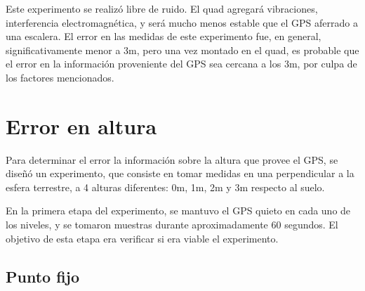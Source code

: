 \documentclass[spanish,12pt,a4paper,titlepage]{report}
\begin{document}
Este experimento se realizó libre de ruido. El quad agregará vibraciones, interferencia electromagnética, y será mucho menos estable que el GPS aferrado a una escalera. El error en las medidas de este experimento fue, en general, significativamente menor a 3m, pero una vez montado en el quad, es probable que el error en la información proveniente del GPS sea cercana a los 3m, por culpa de los factores mencionados.

%
%

\section{Error en altura}
\label{sec:error-en-altura}

Para determinar el error la información sobre la altura que provee el GPS, se diseñó un experimento, que consiste en tomar medidas en una perpendicular a la esfera terrestre, a 4 alturas diferentes: 0m, 1m, 2m y 3m respecto al suelo.

En la primera etapa del experimento, se mantuvo el GPS quieto en cada uno de los niveles, y se tomaron muestras durante aproximadamente 60 segundos. El objetivo de esta etapa era verificar si era viable el experimento.

\subsection{Punto fijo}
\label{sec:altura-punto-fijo}
\end{document}
